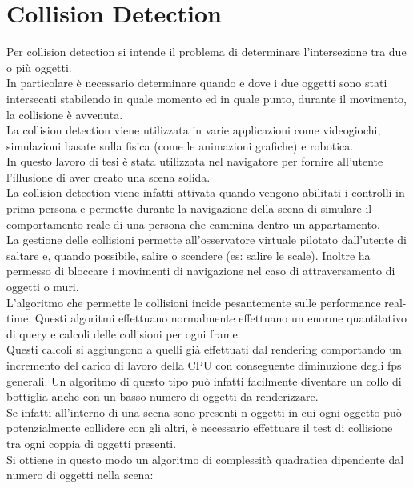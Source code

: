 \section{Collision Detection}
\label{sec:chapter_navigazione_scena_collision_detec}

Per collision detection si intende il problema di determinare l’intersezione tra due o più oggetti. 
\\
In particolare è necessario determinare quando e dove i due oggetti sono stati intersecati stabilendo in quale momento ed in quale punto, durante il movimento, la collisione è avvenuta.
\\
La collision detection viene utilizzata in varie applicazioni come videogiochi, simulazioni basate sulla fisica (come le animazioni grafiche) e robotica.
\\
In questo lavoro di tesi è stata utilizzata nel navigatore per fornire all’utente l’illusione di aver creato una scena solida.
\\
La collision detection viene infatti attivata quando vengono abilitati i controlli in prima persona e permette durante la navigazione della scena di simulare il comportamento reale di una persona che cammina dentro un appartamento.
\\
La gestione delle collisioni permette all’osservatore virtuale pilotato dall’utente di saltare e, quando possibile, salire o scendere (es: salire le scale). Inoltre ha permesso di bloccare i movimenti di navigazione nel caso di attraversamento di oggetti o muri.
\\
L’algoritmo che permette le collisioni incide pesantemente sulle performance real-time.
Questi algoritmi effettuano normalmente effettuano un enorme quantitativo di query e calcoli delle collisioni per ogni frame. 
\\
Questi calcoli si aggiungono a quelli già effettuati dal rendering comportando un incremento del carico di lavoro della CPU con conseguente diminuzione degli fps generali. Un algoritmo di questo tipo può infatti facilmente diventare un collo di bottiglia anche con un basso numero di oggetti da renderizzare.
\\
Se infatti all’interno di una scena sono presenti n oggetti in cui ogni oggetto può potenzialmente collidere con gli altri, è necessario effettuare il test di collisione tra ogni coppia di oggetti presenti. 
\\
Si ottiene in questo modo un algoritmo di complessità quadratica  dipendente dal numero di oggetti nella scena:

